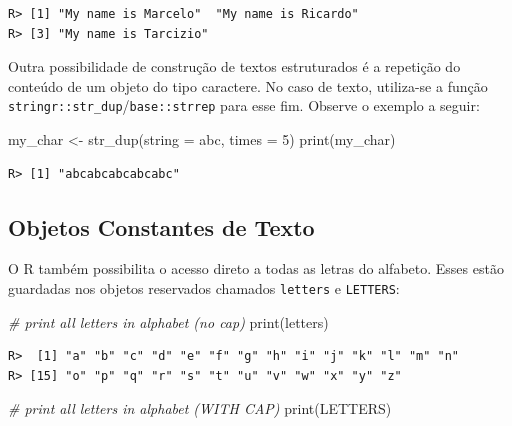 \documentclass[
  11pt,
]{book}
\newenvironment{Shaded}{\begin{snugshade}}{\end{snugshade}}
\newcommand{\AttributeTok}[1]{\textcolor[rgb]{0.61,0.61,0.61}{#1}}
\newcommand{\CommentTok}[1]{\textcolor[rgb]{0.37,0.37,0.37}{\textit{#1}}}
\newcommand{\DecValTok}[1]{\textcolor[rgb]{0.06,0.06,0.06}{#1}}
\newcommand{\FunctionTok}[1]{\textcolor[rgb]{0,0,0}{#1}}
\newcommand{\NormalTok}[1]{#1}
\newcommand{\OtherTok}[1]{\textcolor[rgb]{0.37,0.37,0.37}{#1}}
\newcommand{\StringTok}[1]{\textcolor[rgb]{0.5,0.5,0.5}{#1}}
\begin{document}
\begin{verbatim}
R> [1] "My name is Marcelo"  "My name is Ricardo" 
R> [3] "My name is Tarcizio"
\end{verbatim}

Outra possibilidade de construção de textos estruturados é a repetição do conteúdo de um objeto do tipo caractere. No caso de texto, utiliza-se a função \texttt{stringr::str\_dup}/\texttt{base::strrep} para esse fim. Observe o exemplo a seguir: 

\begin{Shaded}
\begin{Highlighting}[]
\NormalTok{my\_char }\OtherTok{\textless{}{-}} \FunctionTok{str\_dup}\NormalTok{(}\AttributeTok{string =} \StringTok{\textquotesingle{}abc\textquotesingle{}}\NormalTok{, }\AttributeTok{times =} \DecValTok{5}\NormalTok{)}
\FunctionTok{print}\NormalTok{(my\_char)}
\end{Highlighting}
\end{Shaded}

\begin{verbatim}
R> [1] "abcabcabcabcabc"
\end{verbatim}

\hypertarget{objetos-constantes-de-texto}{%
\subsection{Objetos Constantes de Texto}\label{objetos-constantes-de-texto}}

O R também possibilita o acesso direto a todas as letras do alfabeto. Esses estão guardadas nos objetos reservados chamados \texttt{letters} e \texttt{LETTERS}:  

\begin{Shaded}
\begin{Highlighting}[]
\CommentTok{\# print all letters in alphabet (no cap)}
\FunctionTok{print}\NormalTok{(letters)}
\end{Highlighting}
\end{Shaded}

\begin{verbatim}
R>  [1] "a" "b" "c" "d" "e" "f" "g" "h" "i" "j" "k" "l" "m" "n"
R> [15] "o" "p" "q" "r" "s" "t" "u" "v" "w" "x" "y" "z"
\end{verbatim}

\begin{Shaded}
\begin{Highlighting}[]
\CommentTok{\# print all letters in alphabet (WITH CAP)}
\FunctionTok{print}\NormalTok{(LETTERS)}
\end{Highlighting}
\end{Shaded}
\end{document}
